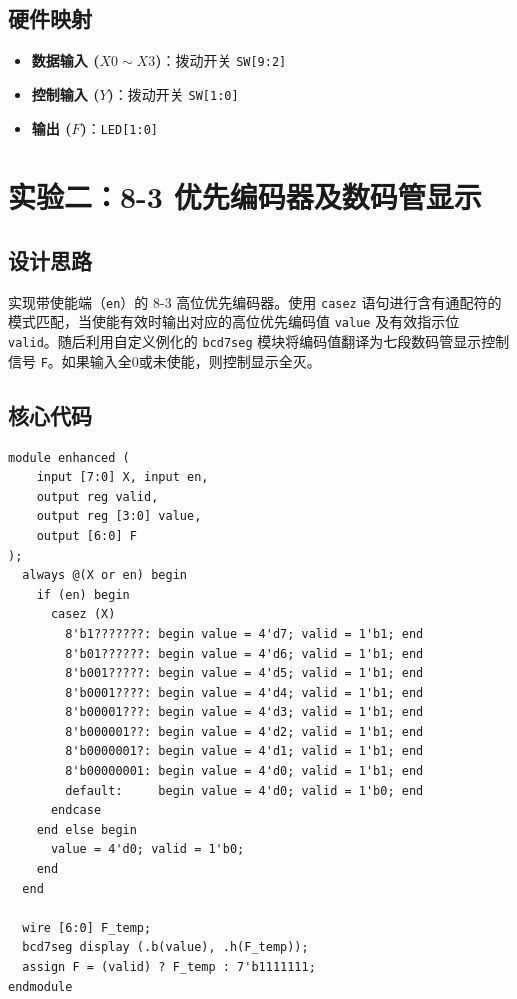 \documentclass[12pt, a4paper]{ctexart}
\begin{document}
\subsection{硬件映射}
\begin{itemize}
    \item \textbf{数据输入 ($X0 \sim X3$)}：拨动开关 \texttt{SW[9:2]}
    \item \textbf{控制输入 ($Y$)}：拨动开关 \texttt{SW[1:0]}
    \item \textbf{输出 ($F$)}：\texttt{LED[1:0]}
\end{itemize}

\section{实验二：8-3 优先编码器及数码管显示}
\subsection{设计思路}
实现带使能端（\texttt{en}）的 8-3 高位优先编码器。使用 \texttt{casez} 语句进行含有通配符的模式匹配，当使能有效时输出对应的高位优先编码值 \texttt{value} 及有效指示位 \texttt{valid}。随后利用自定义例化的 \texttt{bcd7seg} 模块将编码值翻译为七段数码管显示控制信号 \texttt{F}。如果输入全0或未使能，则控制显示全灭。

\subsection{核心代码}
\begin{lstlisting}
module enhanced (
    input [7:0] X, input en,
    output reg valid,
    output reg [3:0] value,
    output [6:0] F
);
  always @(X or en) begin
    if (en) begin
      casez (X)
        8'b1???????: begin value = 4'd7; valid = 1'b1; end
        8'b01??????: begin value = 4'd6; valid = 1'b1; end
        8'b001?????: begin value = 4'd5; valid = 1'b1; end
        8'b0001????: begin value = 4'd4; valid = 1'b1; end
        8'b00001???: begin value = 4'd3; valid = 1'b1; end
        8'b000001??: begin value = 4'd2; valid = 1'b1; end
        8'b0000001?: begin value = 4'd1; valid = 1'b1; end
        8'b00000001: begin value = 4'd0; valid = 1'b1; end
        default:     begin value = 4'd0; valid = 1'b0; end
      endcase
    end else begin
      value = 4'd0; valid = 1'b0;
    end
  end

  wire [6:0] F_temp;
  bcd7seg display (.b(value), .h(F_temp));
  assign F = (valid) ? F_temp : 7'b1111111;
endmodule
\end{lstlisting}
\end{document}
